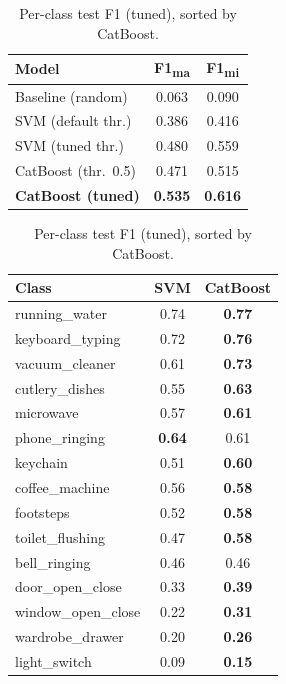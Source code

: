 \documentclass{article}
\begin{document}
\begin{table}[h]
  \begin{minipage}{0.46\linewidth}
    \centering
    \caption{Test performance (tuned thresholds unless noted); identical split,
    features and baseline.}
    \label{tab:final}
    \begin{tabular}{lcc}
      \toprule
      Model & F1\textsubscript{ma} & F1\textsubscript{mi} \\
      \midrule
      Baseline (random)        & 0.063 & 0.090 \\
      SVM (default thr.)       & 0.386 & 0.416 \\
      SVM (tuned thr.)         & 0.480 & 0.559 \\
      CatBoost (thr.\ 0.5)     & 0.471 & 0.515 \\
      \textbf{CatBoost (tuned)}& \textbf{0.535} & \textbf{0.616} \\
      \bottomrule
    \end{tabular}
  \end{minipage}\hfill
  \begin{minipage}{0.5\linewidth}
    \centering
    \caption{Per-class test F1 (tuned), sorted by CatBoost.}
    \label{tab:perclass}
    \small
    \begin{tabular}{lcc}
      \toprule
      Class & SVM & CatBoost \\
      \midrule
      running\_water    & 0.74 & \textbf{0.77} \\
      keyboard\_typing  & 0.72 & \textbf{0.76} \\
      vacuum\_cleaner   & 0.61 & \textbf{0.73} \\
      cutlery\_dishes   & 0.55 & \textbf{0.63} \\
      microwave         & 0.57 & \textbf{0.61} \\
      phone\_ringing    & \textbf{0.64} & 0.61 \\
      keychain          & 0.51 & \textbf{0.60} \\
      coffee\_machine   & 0.56 & \textbf{0.58} \\
      footsteps         & 0.52 & \textbf{0.58} \\
      toilet\_flushing  & 0.47 & \textbf{0.58} \\
      bell\_ringing     & 0.46 & 0.46 \\
      door\_open\_close & 0.33 & \textbf{0.39} \\
      window\_open\_close & 0.22 & \textbf{0.31} \\
      wardrobe\_drawer  & 0.20 & \textbf{0.26} \\
      light\_switch     & 0.09 & \textbf{0.15} \\
      \bottomrule
    \end{tabular}
  \end{minipage}
\end{table}
\end{document}
